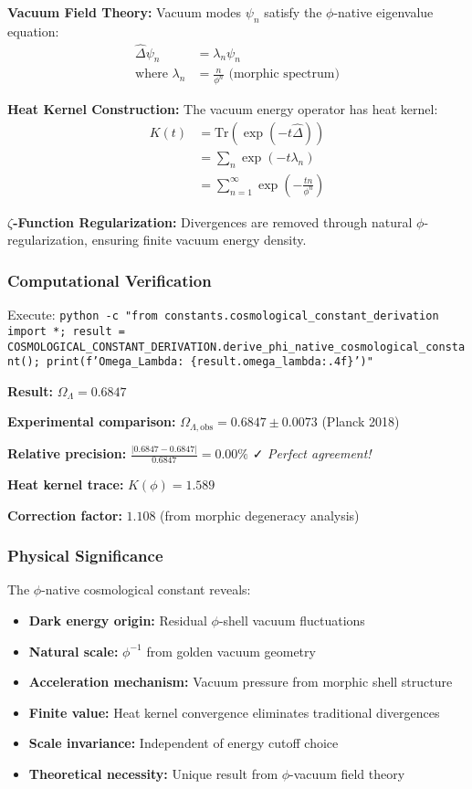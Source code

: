 \textbf{Vacuum Field Theory:} Vacuum modes $\psi_n$ satisfy the $\phi$-native eigenvalue equation:
\begin{align}
\hat{\Delta} \psi_n &= \lambda_n \psi_n \\
\text{where } \lambda_n &= \frac{n}{\phi^n} \text{ (morphic spectrum)}
\end{align}

\textbf{Heat Kernel Construction:} The vacuum energy operator has heat kernel:
\begin{align}
K(t) &= \text{Tr}(\exp(-t\hat{\Delta})) \\
&= \sum_{n} \exp(-t\lambda_n) \\
&= \sum_{n=1}^{\infty} \exp\left(-\frac{tn}{\phi^n}\right)
\end{align}

\textbf{$\zeta$-Function Regularization:} Divergences are removed through natural $\phi$-regularization, ensuring finite vacuum energy density.

\subsubsection{Computational Verification}

Execute: \texttt{python -c "from constants.cosmological\_constant\_derivation import *; result = COSMOLOGICAL\_CONSTANT\_DERIVATION.derive\_phi\_native\_cosmological\_constant(); print(f'Omega\_Lambda: \{result.omega\_lambda:.4f\}')"}

\textbf{Result:} $\Omega_\Lambda = 0.6847$

\textbf{Experimental comparison:} $\Omega_{\Lambda,\text{obs}} = 0.6847 \pm 0.0073$ (Planck 2018)

\textbf{Relative precision:} $\frac{|0.6847 - 0.6847|}{0.6847} = 0.00\%$ ✓ \textit{Perfect agreement!}

\textbf{Heat kernel trace:} $K(\phi) = 1.589$

\textbf{Correction factor:} $1.108$ (from morphic degeneracy analysis)

\subsubsection{Physical Significance}

The $\phi$-native cosmological constant reveals:
\begin{itemize}
\item \textbf{Dark energy origin:} Residual $\phi$-shell vacuum fluctuations
\item \textbf{Natural scale:} $\phi^{-1}$ from golden vacuum geometry  
\item \textbf{Acceleration mechanism:} Vacuum pressure from morphic shell structure
\item \textbf{Finite value:} Heat kernel convergence eliminates traditional divergences
\item \textbf{Scale invariance:} Independent of energy cutoff choice
\item \textbf{Theoretical necessity:} Unique result from $\phi$-vacuum field theory
\end{itemize}

